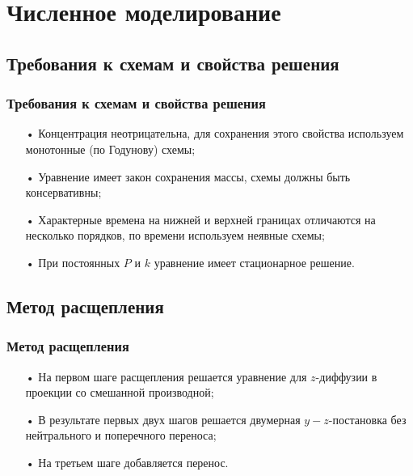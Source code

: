 \documentclass[9pt, apectratio=43,unicode]{beamer}
\begin{document}
\section{Численное моделирование}
\subsection{Требования к схемам и свойства решения}
\begin{frame}\frametitle{Требования к схемам и свойства решения}

\begin{itemize}
\item[•] Концентрация неотрицательна, для сохранения этого свойства используем монотонные (по Годунову) схемы;
\item[•] Уравнение имеет закон сохранения массы, схемы должны быть консервативны;
\item[•] Характерные времена на нижней и верхней границах отличаются на несколько порядков, по времени используем неявные схемы;
\item[•] При постоянных $P$ и $k$ уравнение имеет стационарное решение.
\end{itemize}

\end{frame}

\subsection{Метод расщепления}
\begin{frame}\frametitle{Метод расщепления}

\begin{itemize}
\item[•] На первом шаге расщепления решается уравнение для $z$-диффузии в проекции со смешанной производной;
\item[•] В результате первых двух шагов решается двумерная $y-z$-постановка без нейтрального и поперечного переноса;
\item[•] На третьем шаге добавляется перенос.
\end{itemize}

\end{frame}
\end{document}
